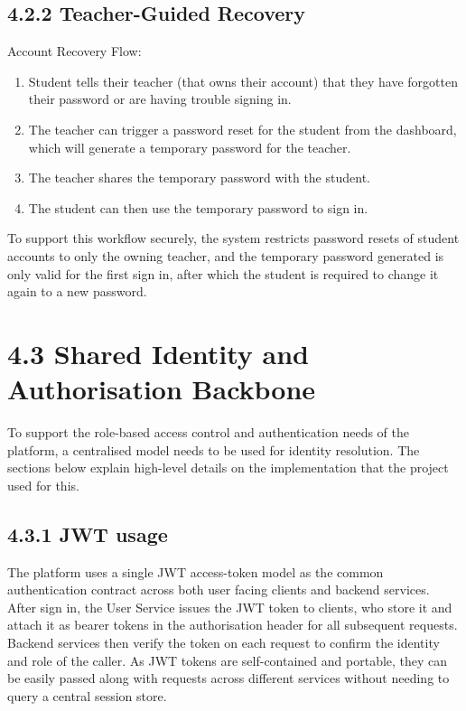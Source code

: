 \documentclass[
  12pt,
  a4paper,
]{report}
\begin{document}
\hypertarget{student-sign-in}{%
\subsection{4.2.2 Teacher-Guided
Recovery}\label{student-sign-in}}

Account Recovery Flow:
\begin{enumerate}
  \item Student tells their teacher (that owns their account) that they have forgotten their password or are having trouble signing in.
  \item The teacher can trigger a password reset for the student from the dashboard, which will generate a temporary password for the teacher.
  \item The teacher shares the temporary password with the student.
  \item The student can then use the temporary password to sign in.
\end{enumerate}

To support this workflow securely, the system restricts password resets of student accounts to
only the owning teacher, and the temporary password generated is only valid for the first
sign in, after which the student is required to change it again to a new password.

\hypertarget{centralised-authorisation-and-role-based-access}{%
\section{4.3 Shared Identity and Authorisation
Backbone}\label{centralised-authorisation-and-role-based-access}}

To support the role-based access control and authentication needs of the platform, a centralised model needs to
be used for identity resolution. The sections below explain high-level details on the implementation that
the project used for this.

\hypertarget{jwt-verification-and-role-guards}{%
\subsection{4.3.1 JWT usage}\label{jwt-verification-and-role-guards}}

The platform uses a single JWT access-token model as the common
authentication contract across both user facing clients and backend services.
After sign in, the User Service issues the JWT token to clients, who store it and attach it
as bearer tokens in the authorisation header for all subsequent requests.
Backend services then verify the token on each request to confirm the identity and role of the caller.
As JWT tokens are self-contained and portable, they can be easily passed along with requests across different services without needing to query a central session store.
\end{document}
